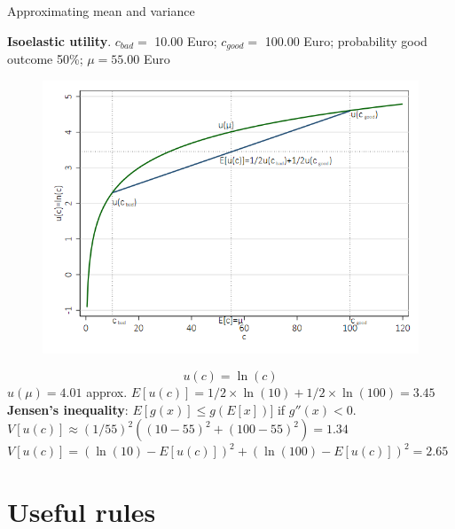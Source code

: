 \documentclass[11pt,table]{beamer}
\begin{document}
\begin{frame}{Approximating mean and variance}

\small

\begin{example} \textbf{Isoelastic utility}.
\footnotesize
$c_{bad}=$	10.00 Euro; $c_{good}=$	100.00 Euro;  probability good outcome	50\%; $\mu=55.00$ Euro\\[2ex]

\begin{figure}
  \vspace{-20pt}
  \begin{center}
		\includegraphics[height=0.46\textheight]{figures/Jensens_inequality.png}
	\label{fig:Jensens_inequality}
  \vspace{-40pt}
  \end{center}
\end{figure}

$$u(c)= \ln(c)$$
$u(\mu)= 4.01$ approx. $E[u(c)]= 1/2\times \ln(10)+1/2\times \ln(100)=3.45$\\[8ex]

\textbf{Jensen's inequality}: $E[g(x)]\leq g(E[x])]$ if $g''(x)<0$.\\[10ex]

$V[u(c)]\approx (1/55)^{2}((10-55)^2+(100-55)^2) =1.34$\\
$V[u(c)]= (\ln(10)-E[u(c)])^2+(\ln(100)-E[u(c)])^2 =2.65$
\end{example}

\end{frame}

\section{Useful rules}
\end{document}
